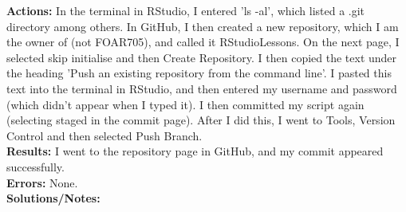 \documentclass{article}
\begin{document}
\begin{FlushLeft}
\textbf{Actions:} In the terminal in RStudio, I entered 'ls -al', which listed a .git directory among others. In GitHub, I then created a new repository, which I am the owner of (not FOAR705), and called it R\textunderscore Studio\textunderscore Lessons. On the next page, I selected skip initialise and then Create Repository. I then copied the text under the heading 'Push an existing repository from the command line'. I pasted this text into the terminal in RStudio, and then entered my username and password (which didn't appear when I typed it). I then committed my script again (selecting staged in the commit page). After I did this, I went to Tools, Version Control and then selected Push Branch.  \\
\textbf{Results:} I went to the repository page in GitHub, and my commit appeared successfully.\\
\textbf{Errors:} None.\\
\textbf{Solutions/Notes:}\\


\end{FlushLeft}
\end{document}
